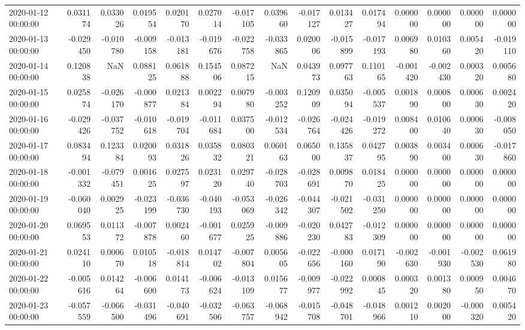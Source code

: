 \begin{tabular}{lrrrrrrrrrrrrrr}
2020-01-12 00:00:00 & 0.031174 & 0.033026 & 0.019554 & 0.020170 & 0.027014 & -0.017105 & 0.039660 & -0.017127 & 0.013427 & 0.017494 & 0.000000 & 0.000000 & 0.000000 & 0.000000 \\
2020-01-13 00:00:00 & -0.029450 & -0.010780 & -0.009158 & -0.013181 & -0.019676 & -0.022758 & -0.033865 & 0.020006 & -0.015899 & -0.017193 & 0.006980 & 0.010360 & 0.005420 & -0.019110 \\
2020-01-14 00:00:00 & 0.120838 & NaN & 0.088125 & 0.061888 & 0.154506 & 0.087215 & NaN & 0.043973 & 0.097763 & 0.110165 & -0.001420 & -0.002430 & 0.000320 & 0.005680 \\
2020-01-15 00:00:00 & 0.025874 & -0.026170 & -0.000877 & 0.021384 & 0.002294 & 0.007980 & -0.003252 & 0.120909 & 0.035094 & -0.005537 & 0.001890 & 0.000800 & 0.000630 & 0.002420 \\
2020-01-16 00:00:00 & -0.029426 & -0.037752 & -0.010618 & -0.019704 & -0.011684 & 0.037500 & -0.012534 & -0.026764 & -0.024426 & -0.019272 & 0.008400 & 0.010640 & 0.000630 & -0.008050 \\
2020-01-17 00:00:00 & 0.083494 & 0.123384 & 0.020093 & 0.031826 & 0.035832 & 0.080321 & 0.060163 & 0.065000 & 0.135837 & 0.042795 & 0.003890 & 0.003400 & 0.000630 & -0.017860 \\
2020-01-18 00:00:00 & -0.001332 & -0.079451 & 0.001625 & 0.027597 & 0.023120 & 0.029740 & -0.028703 & -0.028691 & 0.009870 & 0.018425 & 0.000000 & 0.000000 & 0.000000 & 0.000000 \\
2020-01-19 00:00:00 & -0.060040 & 0.002925 & -0.023199 & -0.036730 & -0.040193 & -0.053069 & -0.026342 & -0.044307 & -0.021502 & -0.031250 & 0.000000 & 0.000000 & 0.000000 & 0.000000 \\
2020-01-20 00:00:00 & 0.069553 & 0.011372 & -0.007878 & 0.002460 & -0.001677 & 0.025925 & -0.009886 & -0.020230 & 0.042783 & -0.012309 & 0.000000 & 0.000000 & 0.000000 & 0.000000 \\
2020-01-21 00:00:00 & 0.024110 & 0.000670 & 0.010518 & -0.018814 & 0.014702 & -0.007804 & 0.005605 & -0.022656 & -0.000160 & 0.017190 & -0.002630 & -0.001930 & -0.002530 & 0.061980 \\
2020-01-22 00:00:00 & -0.005616 & 0.014264 & -0.006600 & 0.014173 & -0.006624 & -0.013109 & 0.015677 & -0.009977 & -0.022992 & 0.000845 & 0.000320 & 0.001380 & 0.000950 & 0.004670 \\
2020-01-23 00:00:00 & -0.057559 & -0.066500 & -0.031496 & -0.040691 & -0.032506 & -0.063757 & -0.068942 & -0.015708 & -0.048701 & -0.048966 & 0.001210 & 0.002000 & -0.000320 & 0.005420 \\

\end{tabular}
